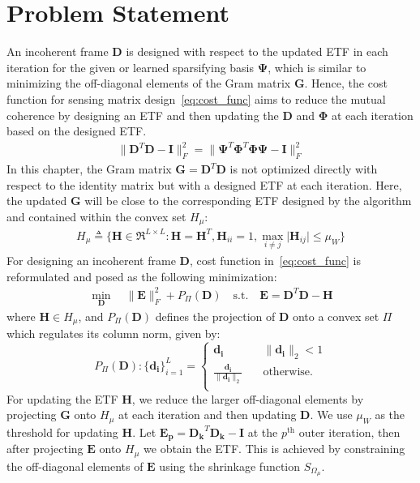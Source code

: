 \section{Problem Statement}
%
An incoherent frame $\bm{D}$ is designed with respect to the updated ETF in each iteration for the given or learned sparsifying basis $\bm{\Psi}$, which is similar to minimizing the off-diagonal elements of the Gram matrix $\bm{G}$. Hence, the cost function for sensing matrix design~\eqref{eq:cost_func} aims to reduce the mutual coherence by designing an ETF and then updating the $\bm{D}$ and $\bm{\Phi}$ at each iteration based on the designed ETF.
%
\begin{align}
 \label{eq:cost_func}
    \|\bm{D}^{T}\bm{D}-\bm{I}\|_{F}^{2} = \|\bm{\Psi}^{T}\bm{\Phi}^{T}\bm{\Phi}\bm{\Psi}-\bm{I}\|_{F}^{2}   
\end{align}
%
In this chapter, the Gram matrix $\bm{G} = \bm{D}^{T} \bm{D}$ is not optimized directly with respect to the identity matrix but with a designed ETF at each iteration. Here, the updated $\bm{G}$ will be close to the corresponding ETF designed by the algorithm and contained within the convex set $H_{\mu}$:
%
\begin{align}\nonumber
    H_{\mu} \triangleq \{\bm{H} \in \Re^{L \times L}: \bm{H}=\bm{H}^{T}, \bm{H}_{ii}=1, \underset{i\neq j}{\max}\lvert \bm{H}_{ij}\rvert \leq \mu_{W}\}
\end{align}
%
For designing an incoherent frame $\bm{D}$, cost function in~\eqref{eq:cost_func} is reformulated and posed as the following minimization:
%
\begin{align}
    \label{eq:frame_D_opt}
    \underset{\bm{D}}{\min} \quad \|\bm{E}\|_{F}^{2} + P_{\Pi}(\bm{D}) \quad \text{s.t.} \quad \bm{E} = \bm{D}^{T}\bm{D}-\bm{H}
\end{align}
%
where $\bm{H} \in H_{\mu}$, and $P_{\Pi}(\bm{D})$ defines the projection of $\bm{D}$ onto a convex set $\Pi$ which regulates its column norm, given by:
%
\begin{equation}\nonumber
    P_{\Pi}(\bm{D}): \{\bm{d_{i}}\}_{i=1}^{L} =
    \begin{cases}
      \bm{d_{i}} & \quad \|\bm{d_{i}}\|_{2} < 1\\
      \frac{\bm{d_{i}}}{\|\bm{d_{i}}\|_{2} } & \quad \text{otherwise}.\\
    \end{cases} 
\end{equation}
%
For updating the ETF $\bm{H}$, we reduce the larger off-diagonal elements by projecting $\bm{G}$ onto $H_{\mu}$ at each iteration and then updating $\bm{D}$. We use $\mu_{W}$ as the threshold for updating $\bm{H}$. Let $\bm{E_{p}} = \bm{D_{k}}^{T} \bm{D_{k}}-\bm{I}$ at the $p^\text{th}$ outer iteration, then after projecting $\bm{E}$ onto $H_{\mu}$ we obtain the ETF. This is achieved by constraining the off-diagonal elements of $\bm{E}$ using the shrinkage function $S_{\Omega_{\mu}}$.
